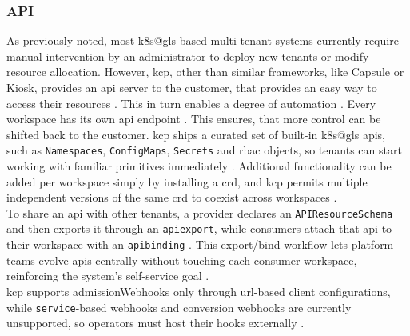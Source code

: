 \documentclass[11pt, a4paper, oneside, listof=totoc]{scrartcl}
\begin{document}
            \subsubsection{API}\label{subsubsec:api}
                As previously noted, most \gls{k8s@gls} based multi-tenant systems currently require
                manual intervention by an administrator to deploy new tenants or modify resource
                allocation.
                However, \gls{kcp}, other than similar frameworks, like Capsule or Kiosk, provides an
                \gls{api} server to the customer, that provides an easy way to access
                their resources \parencites[p.~651]{nguyen2022}{kcpio}.
                This in turn enables a degree of automation \parencite[p.~651]{nguyen2022}.
                Every workspace has its own \gls{api} endpoint \parencite{kcpWorkspaces}.
                This ensures, that more control can be shifted back to the customer.
                \gls{kcp} ships a curated set of built-in \gls{k8s@gls} \glspl{api}, such as
                \texttt{Namespaces}, \texttt{ConfigMaps}, \texttt{Secrets} and \gls{rbac} objects, 
                so tenants can start working with familiar primitives immediately
                \parencite{kcpAPIsBuiltIn}.
                Additional functionality can be added per workspace simply by installing a
                \gls{crd}, and \gls{kcp} permits multiple independent versions of the same \gls{crd}
                to coexist across workspaces \parencite{kcpAPIs}.
                \\
                To share an \gls{api} with other tenants, a provider declares an
                \texttt{APIResourceSchema} and then exports it through an \texttt{\gls{apiexport}},
                while consumers attach that \gls{api} to their workspace with an \texttt{\gls{apibinding}}
                \parencite{kcpAPIsExport}.
                This export/bind workflow lets platform teams evolve \glspl{api} centrally without
                touching each consumer workspace, reinforcing the system's self-service goal
                \parencite{kcpAPIsExport}.
                \\
                \gls{kcp} supports \glspl{admissionWebhook} only through \gls{url}-based client
                configurations, while \texttt{service}-based webhooks and conversion webhooks are
                currently unsupported, so operators must host their hooks externally
                \parencite{kcpAPIsAdmissionWebhooks}.
                \\
\end{document}
